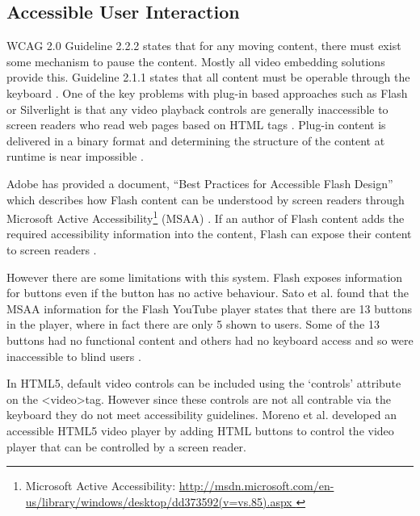 \documentclass[journal]{IEEEtran}
\begin{document}
\subsection{Accessible User Interaction}
WCAG 2.0 Guideline 2.2.2 states that for any moving content, there must exist some mechanism to pause the content. Mostly all video embedding solutions provide this. Guideline 2.1.1 states that all content must be operable through the keyboard \cite{standard:wcag2}. One of the key problems with plug-in based approaches such as Flash or Silverlight is that any video playback controls are generally inaccessible to screen readers who read web pages based on HTML tags \cite{inproceedings:transformingFlashToXML} \cite{incollection:accessibilityEvaluationForMultimediaContent}. Plug-in content is delivered in a binary format and determining the structure of the content at runtime is near impossible \cite{inproceedings:transformingFlashToXML}.

Adobe has provided a document, ``Best Practices for Accessible Flash Design'' which describes how Flash content can be understood by screen readers through Microsoft Active Accessibility\footnote{Microsoft Active Accessibility: \url{http://msdn.microsoft.com/en-us/library/windows/desktop/dd373592(v=vs.85).aspx
}} (MSAA) \cite{whitePaper:bestPracticesForAccessibleFlashDesign}. If an author of Flash content adds the required accessibility information into the content, Flash can expose their content to screen readers \cite{inproceedings:automaticAccesibilityTranscodingForFlashContent}.

However there are some limitations with this system. Flash exposes information for buttons even if the button has no active behaviour. Sato et al. found that the MSAA information for the Flash YouTube player states that there are 13 buttons in the player, where in fact there are only 5 shown to users. Some of the 13 buttons had no functional content and others had no keyboard access and so were inaccessible to blind users \cite{inproceedings:automaticAccesibilityTranscodingForFlashContent}.


In HTML5, default video controls can be included using the `controls' attribute on the \textless video\textgreater tag. However since these controls are not all contrable via the keyboard %
they do not meet accessibility guidelines. Moreno et al. developed an accessible HTML5 video player by adding HTML buttons to control the video player that can be controlled by a screen reader\cite{incollection:html5SupportForAnAccessibleWeb}.
\end{document}
